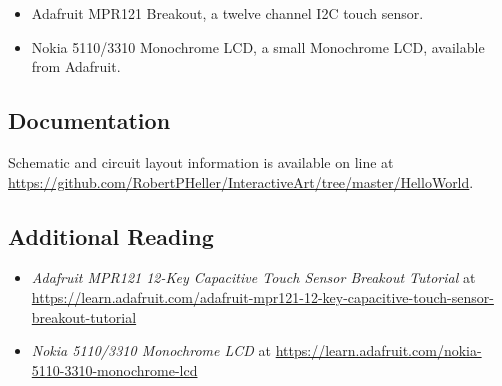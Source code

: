 \begin{itemize}
\item Adafruit MPR121 Breakout, a twelve channel I2C touch sensor.
\item Nokia 5110/3310 Monochrome LCD, a small Monochrome LCD, available from 
Adafruit.
\end{itemize}

\subsection*{Documentation}

Schematic and circuit layout information is available on line at 
\url{https://github.com/RobertPHeller/InteractiveArt/tree/master/HelloWorld}.

\subsection*{Additional Reading}

\begin{itemize}
\item \textit{Adafruit MPR121 12-Key Capacitive Touch Sensor Breakout
Tutorial} at
\url{https://learn.adafruit.com/adafruit-mpr121-12-key-capacitive-touch-sensor-breakout-tutorial}
\item \textit{Nokia 5110/3310 Monochrome LCD} at
\url{https://learn.adafruit.com/nokia-5110-3310-monochrome-lcd} 
\end{itemize}
